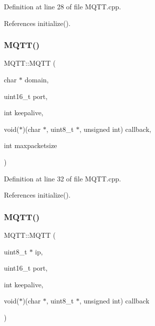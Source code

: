 Definition at line 28 of file M\+Q\+T\+T.\+cpp.



References initialize().

\mbox{\label{class_m_q_t_t_a418f1aaefd9ebb233358a532d82d2307}} 
\subsubsection{\texorpdfstring{M\+Q\+T\+T()}{MQTT()}\hspace{0.1cm}{\footnotesize\ttfamily [7/9]}}
{\footnotesize\ttfamily M\+Q\+T\+T\+::\+M\+Q\+TT (\begin{DoxyParamCaption}\item[{char $\ast$}]{domain,  }\item[{uint16\+\_\+t}]{port,  }\item[{int}]{keepalive,  }\item[{void($\ast$)(char $\ast$, uint8\+\_\+t $\ast$, unsigned int)}]{callback,  }\item[{int}]{maxpacketsize }\end{DoxyParamCaption})}



Definition at line 32 of file M\+Q\+T\+T.\+cpp.



References initialize().

\mbox{\label{class_m_q_t_t_ad68f2a18a197fa8944e8cc8e1950af5a}} 
\subsubsection{\texorpdfstring{M\+Q\+T\+T()}{MQTT()}\hspace{0.1cm}{\footnotesize\ttfamily [8/9]}}
{\footnotesize\ttfamily M\+Q\+T\+T\+::\+M\+Q\+TT (\begin{DoxyParamCaption}\item[{uint8\+\_\+t $\ast$}]{ip,  }\item[{uint16\+\_\+t}]{port,  }\item[{int}]{keepalive,  }\item[{void($\ast$)(char $\ast$, uint8\+\_\+t $\ast$, unsigned int)}]{callback }\end{DoxyParamCaption})}



